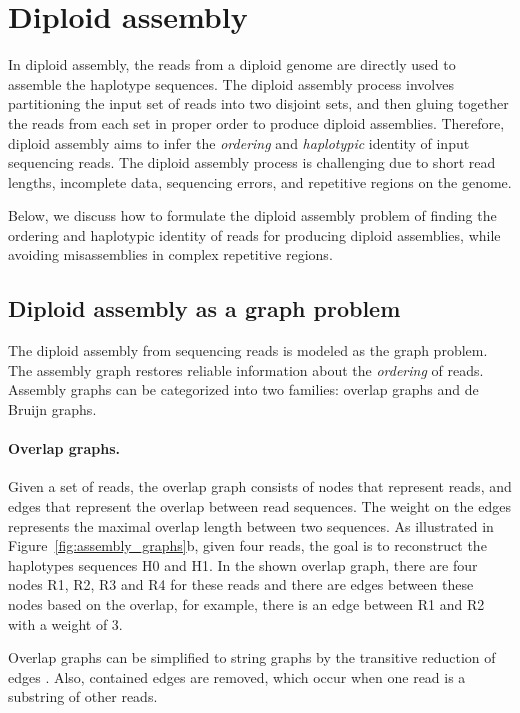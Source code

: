 \section{Diploid assembly}\label{sec:dip}
In diploid assembly, the reads from a diploid genome are directly used to assemble the haplotype sequences. 
The diploid assembly process involves partitioning the input set of reads into two disjoint sets, and then gluing together the reads from each set in proper order to produce diploid assemblies.
Therefore, diploid assembly aims to infer the \textit{ordering} and \textit{haplotypic} identity of input sequencing reads. 
The diploid assembly process is challenging due to short read lengths, incomplete data, sequencing errors, and repetitive regions on the genome.

Below, we discuss how to formulate the diploid assembly problem of finding the ordering and haplotypic identity of reads for producing diploid assemblies, while avoiding misassemblies in complex repetitive regions.

\subsection{Diploid assembly as a graph problem}
The diploid assembly from sequencing reads is modeled as the graph problem.
The assembly graph restores reliable information about the \textit{ordering} of reads.
Assembly graphs can be categorized into two families: overlap graphs and de Bruijn graphs.
\paragraph{Overlap graphs.}
Given a set of reads, the overlap graph consists of nodes that represent reads, and edges that represent the overlap between read sequences.
The weight on the edges represents the maximal overlap length between two sequences. As illustrated in Figure~\ref{fig:assembly_graphs}b, 
given four reads, the goal is to reconstruct the haplotypes sequences H0 and H1.
In the shown overlap graph, there are four nodes R1, R2, R3 and R4 for these reads and there are edges between these nodes based on the overlap, for example, there is an edge between R1 and R2 with a weight of 3.

Overlap graphs can be simplified to string graphs by the transitive reduction of edges \citep{myers2005fragment}.
Also, contained edges \citep{myers2005fragment} are removed, which occur when one read is a substring of other reads.

